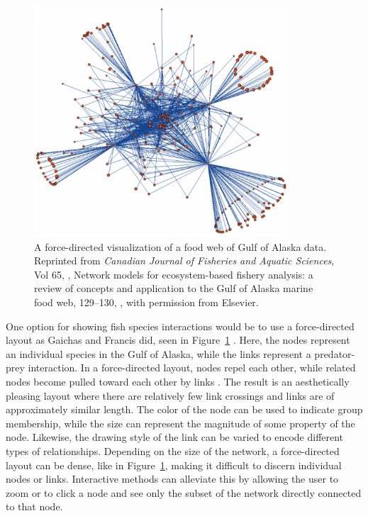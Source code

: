 \begin{figure}[h]
	\centering
	\includegraphics[width=0.85\textwidth]{figures/png/gaichas.png}
	\caption[A force-directed visualization of a food web of Gulf of Alaska data]{A force-directed visualization of a food web of Gulf of Alaska data. Reprinted from \textit{Canadian Journal of Fisheries and Aquatic Sciences}, Vol 65, \citeauthor{gaichas2008}, Network models for ecosystem-based fishery analysis: a review of concepts and application to the Gulf of Alaska marine food web, 129--130, \textcopyright \citeyear{gaichas2008}, with permission from Elsevier.}
	\label{fig:gaichas}
\end{figure}


One option for showing fish species interactions would be to use a force-directed layout as Gaichas and Francis did, seen in Figure~\ref{fig:gaichas} \citeyearpar{gaichas2008}.  Here, the nodes represent an individual species in the Gulf of Alaska, while the links represent a predator-prey interaction.  In a force-directed layout, nodes repel each other, while related nodes become pulled toward each other by links \cite{heer2010}.  The result is an aesthetically pleasing layout where there are relatively few link crossings and links are of approximately similar length.  The color of the node can be used to indicate group membership, while the size can represent the magnitude of some property of the node.  Likewise, the drawing style of the link can be varied to encode different types of relationships.  Depending on the size of the network, a force-directed layout can be dense, like in Figure~\ref{fig:gaichas}, making it difficult to discern individual nodes or links.  Interactive methods can alleviate this by allowing the user to zoom or to click a node and see only the subset of the network directly connected to that node.

